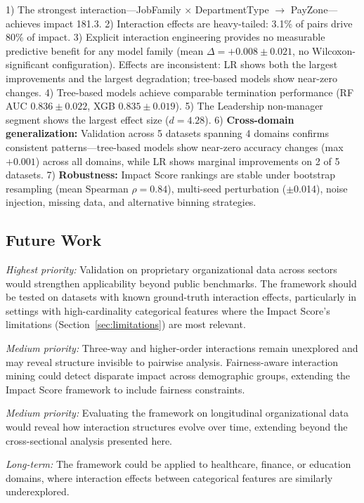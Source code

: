 \documentclass[conference]{IEEEtran}
\begin{document}
1) The strongest interaction---JobFamily $\times$ DepartmentType $\to$ PayZone---achieves impact 181.3.
2) Interaction effects are heavy-tailed: 3.1\% of pairs drive 80\% of impact.
3) Explicit interaction engineering provides no measurable predictive benefit for any model family (mean $\Delta = +0.008\pm0.021$, no Wilcoxon-significant configuration). Effects are inconsistent: LR shows both the largest improvements and the largest degradation; tree-based models show near-zero changes.
4) Tree-based models achieve comparable termination performance (RF AUC $0.836\pm0.022$, XGB $0.835\pm0.019$).
5) The Leadership non-manager segment shows the largest effect size ($d = 4.28$).
6) \textbf{Cross-domain generalization:} Validation across 5 datasets spanning 4 domains confirms consistent patterns---tree-based models show near-zero accuracy changes (max $+0.001$) across all domains, while LR shows marginal improvements on 2 of 5 datasets.
7) \textbf{Robustness:} Impact Score rankings are stable under bootstrap resampling (mean Spearman $\rho = 0.84$), multi-seed perturbation ($\pm$0.014), noise injection, missing data, and alternative binning strategies.

\subsection{Future Work}

\textit{Highest priority:} Validation on proprietary organizational data across sectors would strengthen applicability beyond public benchmarks. The framework should be tested on datasets with known ground-truth interaction effects, particularly in settings with high-cardinality categorical features where the Impact Score's limitations (Section~\ref{sec:limitations}) are most relevant.

\textit{Medium priority:} Three-way and higher-order interactions remain unexplored and may reveal structure invisible to pairwise analysis. Fairness-aware interaction mining could detect disparate impact across demographic groups, extending the Impact Score framework to include fairness constraints.

\textit{Medium priority:} Evaluating the framework on longitudinal organizational data would reveal how interaction structures evolve over time, extending beyond the cross-sectional analysis presented here.

\textit{Long-term:} The framework could be applied to healthcare, finance, or education domains, where interaction effects between categorical features are similarly underexplored.
\end{document}
